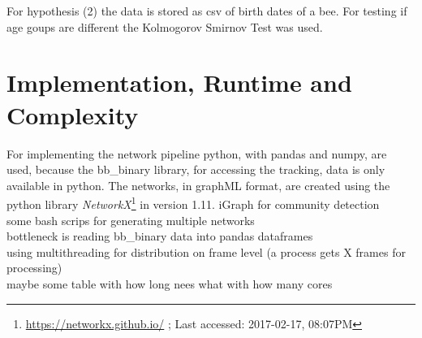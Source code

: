 For hypothesis (2) the data is stored as csv of birth dates of a bee. For testing if age goups are different the Kolmogorov Smirnov Test was used.

\section{Implementation, Runtime and Complexity}
For implementing the network pipeline python, with pandas and numpy, are used, because the bb\_binary library, for accessing the tracking, data is only available in python. The networks, in graphML format, are created using the python library \emph{NetworkX}\footnote{\url{https://networkx.github.io/} ; Last accessed: 2017-02-17, 08:07PM} in version 1.11.
iGraph for community detection\\
some bash scrips for generating multiple networks\\

bottleneck is reading bb\_binary data into pandas dataframes\\
using multithreading for distribution on frame level (a process gets X frames for processing)\\

maybe some table with how long nees what with how many cores\\

